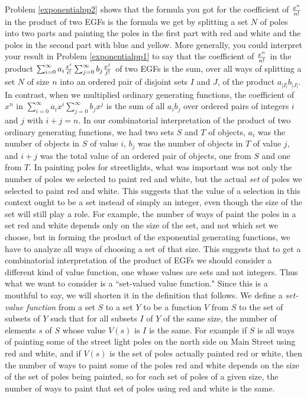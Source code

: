 Problem \ref{exponentialpp2} shows that the formula you got for the
coefficient of $x^n\over n!$ in the product of two EGFs is the formula we
get by splitting a set $N$ of poles into two parts and painting the poles
in the first part with red and white and the poles in the second part with
blue and yellow.  More generally, you could interpret your result in
Problem \ref{exponentialpp1} to say that the coefficient of $x^n\over
n!$ in the product $\sum_{i=0}^\infty a_i {x^i\over i!}
\sum_{j=0}^\infty b_j{x^j\over j!}$ of two EGFs  is the sum, over all
ways of splitting a set
$N$ of size
$n$ into an ordered pair of disjoint sets $I$ and $J$, of the product
$a_{|I|}b_{|J|}$.   In contrast, when we multiplied ordinary generating
functions, the coefficient of
$x^n$ in
$\sum_{i=0}^\infty a_i x^i
\sum_{j=0}^\infty b_j x^j$ is the sum of all $a_ib_j$ over  ordered
pairs of integers $i$ and $j$ with $i + j=n$.  In our combinatorial
interpretation of the product of two ordinary generating functions, we
had two sets $S$ and $T$ of objects, $a_i$ was the number of objects in
$S$ of value $i$, $b_j$ was the number of objects in $T$ of value $j$, and
$i+j$ was the total value of an ordered pair of objects, one from $S$ and
one from $T$.  In painting poles for streetlights, what was important was
not only the number of poles we selected to paint red and white, but the
actual {\em set} of poles we selected to paint red and white.  This
suggests that the value of a selection in this context ought to be a set
instead of simply an integer, even though the size of the set will still
play a role.  For example, the number of ways of paint the poles in a set
red and white depends only on the size of the set, and not which set we
choose, but in forming the product of the exponential generating
functions, we have to analyze all ways of choosing a set of that size. 
This suggests that to get a combinatorial interpretation of the product of
EGFs we should consider a different kind of value function, one whose
values are sets and not integers.  Thus what we want to consider is a
``set-valued value function."  Since this is a mouthful to say, we will
shorten it in the definition that follows.  We define a {\em set-value
function} from  a set
$S$ to a set
$Y$ to be a function
$V$ from $S$ to the set of subsets of $Y$ such that for all subsets $I$ of
$Y$ of the same size, the number of elements $s$ of $S$ whose value
$V(s)$ is $I$ is the same.  For example if $S$ is all ways of painting
some of the street light poles on the north side on Main Street using red
and white, and if
$V(s)$ is the set of poles actually painted red or white, then the number
of ways to paint some of the poles red and white  depends on the size of
the set of poles being painted, so for each set of poles of a given size,
the number of ways to paint that set of poles using red and white is the
same.

